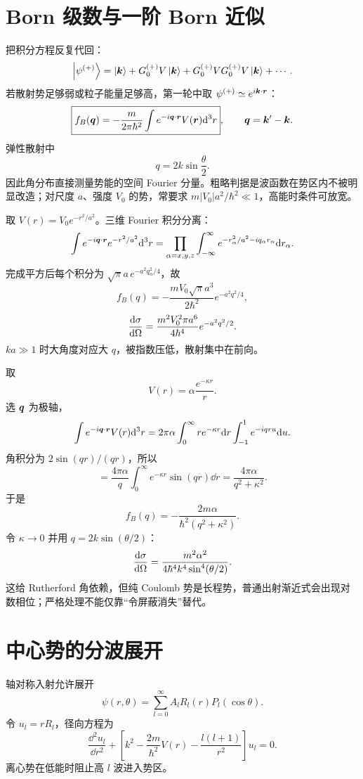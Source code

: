\section{Born 级数与一阶 Born 近似}
把积分方程反复代回：
\[
\left|\psi^{(+)}\right\rangle=
\left|\bm{k}\right\rangle+G_0^{(+)}V\left|\bm{k}\right\rangle
+G_0^{(+)}VG_0^{(+)}V\left|\bm{k}\right\rangle+\cdots.
\]
若散射势足够弱或粒子能量足够高，第一轮中取
$\psi^{(+)}\simeq e^{i\bm{k}\cdot\bm{r}}$：
\[
\boxed{
f_B(\bm{q})=-\frac{m}{2\pi\hbar^2}
\int e^{-i\bm{q}\cdot\bm{r}}V(\bm{r})\mathrm d^3r},
\qquad
\bm{q}=\bm{k}'-\bm{k}.
\]
弹性散射中
\[
q=2k\sin\frac\theta2.
\]
因此角分布直接测量势能的空间 Fourier 分量。粗略判据是波函数在势区内不被明显改造；对尺度 $a$、强度 $V_0$ 的势，常要求
$m|V_0|a^2/\hbar^2\ll1$，高能时条件可放宽。

\begin{examplebox}[title=Gaussian 势的 Born 散射]
取 $V(r)=V_0e^{-r^2/a^2}$。三维 Fourier 积分分离：
\[
\int e^{-i\bm{q}\cdot\bm{r}}e^{-r^2/a^2}\mathrm d^3r
=\prod_{\alpha=x,y,z}\int_{-\infty}^{\infty}
e^{-r_\alpha^2/a^2-iq_\alpha r_\alpha}\mathrm d r_\alpha.
\]
完成平方后每个积分为
$\sqrt\pi a\,e^{-a^2q_\alpha^2/4}$，故
\[
f_B(q)=-\frac{mV_0\sqrt\pi a^3}{2\hbar^2}
e^{-a^2q^2/4},
\]
\[
\frac{\mathrm d \sigma}{\mathrm d \Omega}
=\frac{m^2V_0^2\pi a^6}{4\hbar^4}
e^{-a^2q^2/2}.
\]
$ka\gg1$ 时大角度对应大 $q$，被指数压低，散射集中在前向。
\end{examplebox}

\begin{examplebox}[title=Yukawa 势与 Rutherford 极限]
取
\[
V(r)=\alpha\frac{e^{-\kappa r}}r.
\]
选 $\bm{q}$ 为极轴，
\[
\int e^{-i\bm{q}\cdot\bm{r}}V(r)\mathrm d^3r
=2\pi\alpha\int_0^\infty r e^{-\kappa r}\mathrm d r
\int_{-1}^{1}e^{-iqru}\mathrm d u.
\]
角积分为 $2\sin(qr)/(qr)$，所以
\[
=\frac{4\pi\alpha}{q}
\int_0^\infty e^{-\kappa r}\sin(qr)\dd r
=\frac{4\pi\alpha}{q^2+\kappa^2}.
\]
于是
\[
f_B(q)=-\frac{2m\alpha}{\hbar^2(q^2+\kappa^2)}.
\]
令 $\kappa\to0$ 并用 $q=2k\sin(\theta/2)$：
\[
\frac{\mathrm d \sigma}{\mathrm d \Omega}
=\frac{m^2\alpha^2}{4\hbar^4k^4\sin^4(\theta/2)}.
\]
这给 Rutherford 角依赖，但纯 Coulomb 势是长程势，普通出射渐近式会出现对数相位；严格处理不能仅靠“令屏蔽消失”替代。
\end{examplebox}

\section{中心势的分波展开}
轴对称入射允许展开
\[
\psi(r,\theta)=\sum_{l=0}^\infty A_lR_l(r)P_l(\cos\theta).
\]
令 $u_l=rR_l$，径向方程为
\[
\frac{\dd^2u_l}{\dd r^2}
+\left[k^2-\frac{2m}{\hbar^2}V(r)
-\frac{l(l+1)}{r^2}\right]u_l=0.
\]
离心势在低能时阻止高 $l$ 波进入势区。

